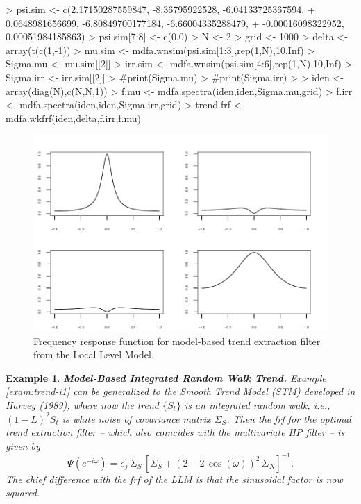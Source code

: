 \documentclass[a4paper]{book}
\newtheorem{Example}{Example}
\begin{document}
\begin{Schunk}
\begin{Sinput}
> psi.sim <- c(2.17150287559847, -8.36795922528, -6.04133725367594, 
+              0.0648981656699, -6.80849700177184, -6.66004335288479, 
+              -0.00016098322952, 0.00051984185863)
> psi.sim[7:8] <- c(0,0)
> N <- 2
> grid <- 1000
> delta <- array(t(c(1,-1)) %
> mu.sim <- mdfa.wnsim(psi.sim[1:3],rep(1,N),10,Inf)
> Sigma.mu <- mu.sim[[2]]
> irr.sim <- mdfa.wnsim(psi.sim[4:6],rep(1,N),10,Inf)
> Sigma.irr <- irr.sim[[2]]
> #print(Sigma.mu)
> #print(Sigma.irr)
> 
> iden <- array(diag(N),c(N,N,1))
> f.mu <- mdfa.spectra(iden,iden,Sigma.mu,grid)
> f.irr <- mdfa.spectra(iden,iden,Sigma.irr,grid)
> trend.frf <- mdfa.wkfrf(iden,delta,f.irr,f.mu)
\end{Sinput}
\end{Schunk}



\begin{figure}[htb!]
\begin{center}
\includegraphics[]{llm_frf.pdf}
\caption{Frequency response function for model-based trend
 extraction filter from the Local Level Model.}
\label{fig:llm-frf}
\end{center}
\end{figure} 


\begin{Example} {\bf Model-Based Integrated Random Walk Trend.} \rm
\label{exam:trend-i2}
  Example \ref{exam:trend-i1} can be generalized to the Smooth 
  Trend Model (STM) developed in Harvey (1989),
 where now the trend $\{ S_t \}$ is an integrated random walk, 
 i.e., ${(1-L)}^2 S_t$ is white noise of
 covariance matrix $\Sigma_{S}$.   Then the frf for the optimal 
 trend extraction filter -- which also coincides
 with the multivariate HP filter  -- is given by
\[ 
 \Psi (e^{-i \omega}) = e_j^{\prime} \, \Sigma_{S} \, 
 { \left[ \Sigma_{S} + {(2 - 2 \, \cos (\omega))}^2 \, \Sigma_{N} \right] }^{-1}.
\]
 The chief difference with the frf of the LLM is that the sinusoidal factor is now squared.  
\end{Example}
\end{document}
